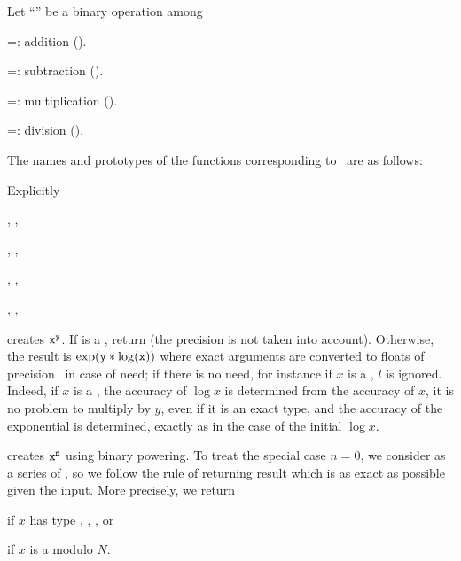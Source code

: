Let ``\op'' be a binary operation among

\op=: addition ().

\op=: subtraction ().

\op=: multiplication ().

\op=: division ().

\noindent The names and prototypes of the functions corresponding
to \op\ are as follows:




\noindent Explicitly

, ,

, ,

, ,

, ,


 creates ${\tt x}^{{\tt y}}$. If
 is a , return  (the precision  is not
taken into account). Otherwise, the result is $\exp({\tt y}*\log({\tt x}))$
where exact arguments are converted to floats of precision~ in case of
need; if there is no need, for instance if $x$ is a , $l$ is
ignored. Indeed, if $x$ is a , the accuracy of $\log x$ is
determined from the accuracy of $x$, it is no problem to multiply by $y$,
even if it is an exact type, and the accuracy of the exponential is
determined, exactly as in the case of the initial $\log x$.

 creates ${\tt x}^{{\tt n}}$ using
binary powering. To treat the special case $n = 0$, we consider
 as a series of , so we follow the rule of returning
result which is as exact as possible given the input. More precisely,
we return

\item {} if $x$ has type , ,  , or

\item {} if $x$ is a  modulo $N$.

